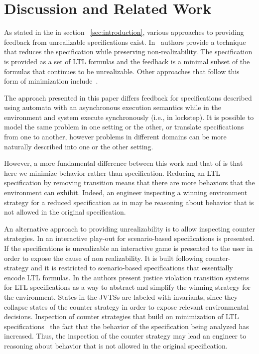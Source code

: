 \section{Discussion and Related Work}\label{sec:discussion}

As stated in the in section ~\ref{sec:introduction}, various approaches to providing feedback from unrealizable specifications exist. In~\cite{DBLP:conf/fmcad/KonighoferHB09} authors provide a technique that reduces the specification while preserving non-realizability. The specification is provided as a set of LTL formulas and the feedback is a minimal subset of the formulas that continues to be unrealizable. Other approaches that follow this form of minimization include~\cite{DBLP:journals/scp/Schuppan12}.
 
The approach presented in this paper differs feedback for specifications described using automata with an asynchronous execution semantics while in \cite{DBLP:conf/fmcad/KonighoferHB09} the environment and system execute synchronously (i.e., in lockstep). It is possible to model the same problem in one setting or the other, or translate specifications from one to another, however problems in different domains can  be more naturally described into one or the other setting.

However, a more fundamental difference between this work and that of \cite{DBLP:conf/fmcad/KonighoferHB09} is that here we minimize behavior rather than specification. Reducing an LTL specification by removing transition means that there are more behaviors that the environment can exhibit. Indeed, an engineer inspecting a winning environment strategy for a reduced specification as in \cite{DBLP:conf/fmcad/KonighoferHB09} may be reasoning about behavior that is not allowed in the original specification.  

An alternative approach to providing unrealizability is to allow inspecting counter strategies. 
 In \cite{DBLP:conf/emsoft/CernyGHRT12} an interactive play-out for scenario-based specifications is presented.  If the specifications is unrealizable an interactive game is presented to the user in order to expose the cause of non realizability.  It is built following \cite{DBLP:conf/hvc/KonighoferHB10} counter-strategy and it is restricted to scenario-based specifications that essentially encode LTL formulas.
 In \cite{DBLP:conf/sigsoft/KuventMR17} the authors present
 justice violation transition systems for LTL specifications as a way to abstract
 and simplify the winning strategy for the environment.
 States in the JVTSs are labeled with invariants, since
 they  collapse states of the counter strategy
 in order to expose relevant environmental decisions.
Inspection of counter strategies that build on minimization of LTL specifications~\cite{DBLP:conf/emsoft/CernyGHRT12,DBLP:conf/sigsoft/KuventMR17} the fact that the behavior of the specification being analyzed has increased. Thus, the inspection of the counter strategy may lead an engineer to reasoning about behavior that is not allowed in the original specification.   

